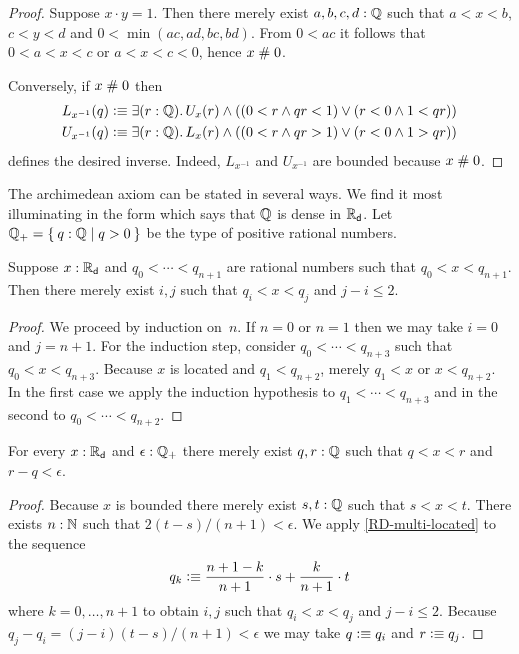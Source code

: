 \begin{proof}
  Suppose $x \cdot y = 1$. Then there merely exist $a, b, c, d : \mathbb{Q}$ such that
  $a < x < b$, $c < y < d$ and $0 < \min (a c, a d, b c, b d)$. From $0 < a c$ it follows
  that $0 < a < x < c$ or $a < x < c < 0$, hence $x \mathrel{\#} 0$.

  Conversely, if $x \mathrel{\#} 0$ then
  \begin{align*}
    L_{x^{-1}}(q) &\defeq
    \exis{r : \Q} U_x(r) \land ((0 < r \land q r < 1) \lor (r < 0 \land 1 < q r))
    \\
    U_{x^{-1}}(q) &\defeq
    \exis{r : \Q} L_x(r) \land ((0 < r \land q r > 1) \lor (r < 0 \land 1 > q r))
  \end{align*}
  defines the desired inverse. Indeed, $L_{x^{-1}}$ and $U_{x^{-1}}$ are bounded because
  $x \mathrel{\#} 0$.
\end{proof}

The archimedean axiom can be stated in several ways. We find it most illuminating in the
form which says that $\mathbb{Q}$ is dense in $\mathbb{R}_\mathsf{d}$. Let $\Qp = \setof{ q : \Q | q > 0 }$ be the
type of positive rational numbers.

\begin{lem} \label{RD-multi-located}
  Suppose $x : \mathbb{R}_\mathsf{d}$ and $q_0 < \cdots < q_{n+1}$ are rational numbers such that $q_0 < x <
  q_{n+1}$. Then there merely exist $i, j$ such that $q_i < x < q_j$ and $j - i \leq 2$.
\end{lem}

\begin{proof}
  We proceed by induction on~$n$. If $n = 0$ or $n = 1$ then we may take $i = 0$ and $j =
  n + 1$. For the induction step, consider $q_0 < \cdots < q_{n+3}$ such that $q_0 < x <
  q_{n+3}$. Because $x$ is located and $q_1 < q_{n+2}$, merely $q_1 < x$ or $x < q_{n+2}$.
  In the first case we apply the induction hypothesis to $q_1 < \cdots < q_{n+3}$ and in
  the second to $q_0 < \cdots < q_{n+2}$.
\end{proof}

\begin{thm} \label{RD-archimedean}
  For every $x : \mathbb{R}_\mathsf{d}$ and $\epsilon : \mathbb{Q}_{+}$ there merely exist $q, r : \mathbb{Q}$ such that $q < x
  < r$ and $r - q < \epsilon$.
\end{thm}

\begin{proof}
  Because $x$ is bounded there merely exist $s, t : \mathbb{Q}$ such that $s < x < t$. There
  exists $n : \mathbb{N}$ such that $2 (t - s)/(n + 1) < \epsilon$. We apply
  \autoref{RD-multi-located} to the sequence
  \begin{equation*}
    q_k \vcentcolon\equiv \frac{n + 1 - k}{n+1} \cdot s + \frac{k}{n+1} \cdot t
  \end{equation*}
  where $k = 0, \ldots, n+1$ to obtain $i, j$ such that $q_i < x < q_j$ and $j - i \leq
  2$. Because $q_j - q_i = (j - i) (t - s)/(n + 1) < \epsilon$ we may take $q \vcentcolon\equiv q_i$
  and $r \vcentcolon\equiv q_j$.
\end{proof}

